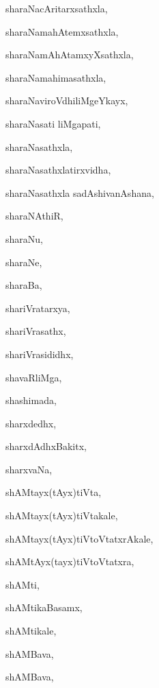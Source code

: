\begin{multicols}{2}
{sharaNacAritarxsathxla}, \pageref{sharaNacAritarxsathxla}

{sharaNamahAtemxsathxla}, \pageref{sharaNamahAtemxsathxla}

{sharaNamAhAtamxyXsathxla}, \pageref{sharaNamAhAtamxyXsathxla}

{sharaNamahimasathxla}, \pageref{sharaNamahimasathxla}

{sharaNaviroVdhiliMgeYkayx}, \pageref{sharaNaviroVdhiliMgeYkayx}

{sharaNasati liMgapati}, \pageref{sharaNasatiliMgapati}

{sharaNasathxla}, \pageref{sharaNasathxla}

{sharaNasathxlatirxvidha}, \pageref{sharaNasathxlatirxvidha}

{sharaNasathxla sadAshivanAshana}, \pageref{sharaNasathxla sadAshivanAshana}

{sharaNAthiR}, \pageref{sharaNAthiR}

{sharaNu}, \pageref{sharaNu}

{sharaNe}, \pageref{sharaNe}

{sharaBa}, \pageref{sharaBa}

{shariVratarxya}, \pageref{shariVratarxya}

{shariVrasathx}, \pageref{shariVrasathx}

{shariVrasididhx}, \pageref{shariVrasididhx}

{shavaRliMga}, \pageref{shavaRliMga}

{shashimada}, \pageref{shashimada}

{sharxdedhx}, \pageref{sharxdedhx}

{sharxdAdhxBakitx}, \pageref{sharxdAdhxBakitx}

{sharxvaNa}, \pageref{sharxvaNa}

{shAMtayx(tAyx)tiVta}, \pageref{shAMtayxtAyxtiVta}

{shAMtayx(tAyx)tiVtakale}, \pageref{shAMtayxtAyxtiVtakale}

{shAMtayx(tAyx)tiVtoVtatxrAkale}, \pageref{shAMtayxtAyxtiVtoVtatxrAkale}

{shAMtAyx(tayx)tiVtoVtatxra}, \pageref{shAMtAyxtayxtiVtoVtatxra}

{shAMti}, \pageref{shAMti}

{shAMtikaBasamx}, \pageref{shAMtikaBasamx}

{shAMtikale}, \pageref{shAMtikale}

{shAMBava}, \pageref{shAMBava1}

{shAMBava}, \pageref{shAMBava2}


\end{multicols}
